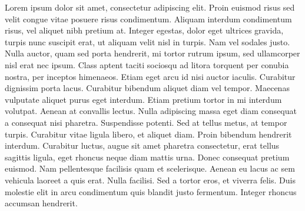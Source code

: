 \documentclass[quali]{mpit}
\begin{document}
 

\capa
\folhaderosto

\begin{agradecimentos}

\end{agradecimentos}

\begin{resumo}
Lorem ipsum dolor sit amet, consectetur adipiscing elit. Proin euismod risus sed velit congue vitae posuere risus condimentum. Aliquam interdum condimentum risus, vel aliquet nibh pretium at. Integer egestas, dolor eget ultrices gravida, turpis nunc suscipit erat, ut aliquam velit nisl in turpis. Nam vel sodales justo. Nulla auctor, quam sed porta hendrerit, mi tortor rutrum ipsum, sed ullamcorper nisl erat nec ipsum. Class aptent taciti sociosqu ad litora torquent per conubia nostra, per inceptos himenaeos. Etiam eget arcu id nisi auctor iaculis. Curabitur dignissim porta lacus. Curabitur bibendum aliquet diam vel tempor. Maecenas vulputate aliquet purus eget interdum. Etiam pretium tortor in mi interdum volutpat. Aenean at convallis lectus. Nulla adipiscing massa eget diam consequat a consequat nisi pharetra. Suspendisse potenti. Sed at tellus metus, at tempor turpis. Curabitur vitae ligula libero, et aliquet diam. Proin bibendum hendrerit interdum. Curabitur luctus, augue sit amet pharetra consectetur, erat tellus sagittis ligula, eget rhoncus neque diam mattis urna. Donec consequat pretium euismod. Nam pellentesque facilisis quam et scelerisque. Aenean eu lacus ac sem vehicula laoreet a quis erat. Nulla facilisi. Sed a tortor eros, et viverra felis. Duis molestie elit in arcu condimentum quis blandit justo fermentum. Integer rhoncus accumsan hendrerit.
\end{resumo}
\end{document}
